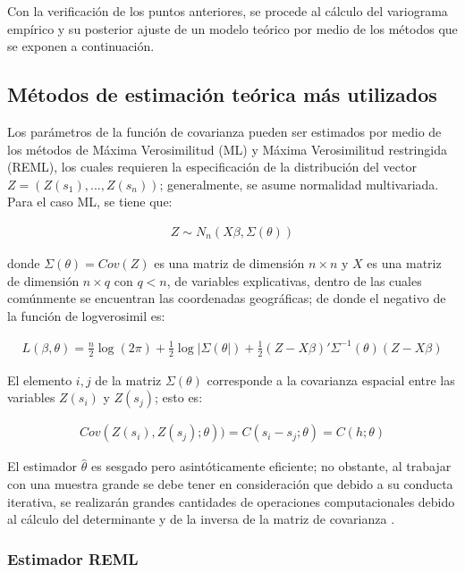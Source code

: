 \documentclass[
]{book}
\begin{document}
Con la verificación de los puntos anteriores, se procede al cálculo del variograma empírico y su posterior ajuste de un modelo teórico por medio de los métodos que se exponen a continuación.

\hypertarget{muxe9todos-de-estimaciuxf3n-teuxf3rica-muxe1s-utilizados}{%
\subsection{Métodos de estimación teórica más utilizados}\label{muxe9todos-de-estimaciuxf3n-teuxf3rica-muxe1s-utilizados}}

Los parámetros de la función de covarianza pueden ser estimados por medio de los métodos de Máxima Verosimilitud (ML) y Máxima Verosimilitud restringida (REML), los cuales requieren la especificación de la distribución del vector \(Z=(Z(s_1),...,Z(s_n))\); generalmente, se asume normalidad multivariada. Para el caso ML, se tiene que:

\begin{align*}
  Z\sim N_n(X\beta,\Sigma(\theta))  
\end{align*}

donde \(\Sigma(\theta)=Cov(Z)\) es una matriz de dimensión \(n \times n\) y \(X\) es una matriz de dimensión \(n\times q\) con \(q<n\), de variables explicativas, dentro de las cuales comúnmente se encuentran las coordenadas geográficas; de donde el negativo de la función de logverosimil es:

\begin{align*}
   L(\beta,\theta)=\frac{n}{2}\log(2\pi)+\frac{1}{2} \log|\Sigma(\theta|)+\frac{1}{2}(Z-X\beta)'\Sigma^{-1}(\theta)(Z-X\beta) 
\end{align*}

El elemento \(i,j\) de la matriz \(\Sigma(\theta)\) corresponde a la covarianza espacial entre las variables \(Z(s_i)\) y \(Z(s_j)\); esto es:

\begin{align*}
  Cov(Z(s_i),Z(s_j);\theta))=C(s_i-s_j;\theta)=C(h;\theta)  
\end{align*}

El estimador \(\hat{\theta}\) es sesgado pero asintóticamente eficiente; no obstante, al trabajar con una muestra grande se debe tener en consideración que debido a su conducta iterativa, se realizarán grandes cantidades de operaciones computacionales debido al cálculo del determinante y de la inversa de la matriz de covarianza \citep{marta}.

\hypertarget{estimador-reml}{%
\subsubsection*{Estimador REML}\label{estimador-reml}}
\end{document}
